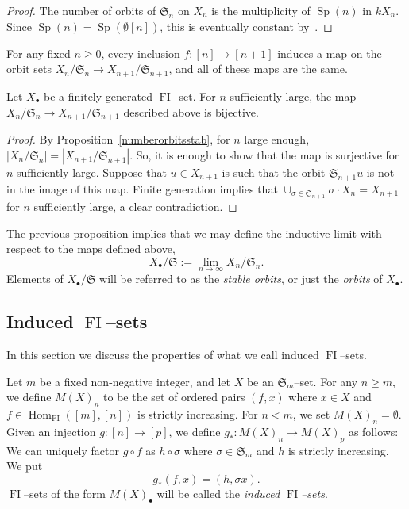 \documentclass[ALCO,ThmDefs,Unicode,epreuves]{cedram}
\DeclareMathOperator{\FI}{FI}
\DeclareMathOperator{\Hom}{Hom}
\DeclareMathOperator{\Sp}{Sp}
\newcommand{\Sn}{\mathfrak{S}}
\newcommand{\dt}{\bullet}
\begin{document}
\begin{proof}
The number of orbits of $\Sn_n$ on $X_n$ is the multiplicity of $\Sp(n)$ in $k X_n$. Since $\Sp(n) = \Sp(\emptyset[n])$, this is eventually constant by~\cite[Theorem~1.13]{CEF}.
\end{proof}

For any fixed $n \geq 0$, every inclusion $f: [n] \to [n+1]$ induces a map on the orbit sets $X_n/\Sn_n \to X_{n+1}/\Sn_{n+1}$, and all of these maps are the same.

\begin{prop} \label{EventuallyBijective}
Let $X_\dt$ be a finitely generated $\FI$--set. For $n$ sufficiently large, the map $X_n/\Sn_n \to X_{n+1}/\Sn_{n+1}$ described above is bijective.
\end{prop}

\begin{proof}
By Proposition~\ref{numberorbitsstab}, for $n$ large enough, $|X_n/\Sn_n| = |X_{n+1}/\Sn_{n+1}|$. So, it is enough to show that the map is surjective for $n$ sufficiently large. Suppose that $u \in X_{n+1}$ is such that the orbit $\Sn_{n+1} u$ is not in the image of this map. Finite generation implies that $\cup_{\sigma \in \Sn_{n+1}} \sigma \cdot X_n=X_{n+1}$ for $n$ sufficiently large, a clear contradiction.
\end{proof}


\begin{definition}
The previous proposition implies that we may define the inductive limit with respect to the maps defined above,
\[
X_{\dt}/\Sn := \lim_{n \to \infty} X_n/\Sn_n.
\]
Elements of $X_{\dt}/\Sn$ will be referred to as the \emph{stable orbits}, or just the \emph{orbits} of $X_\dt$.
\end{definition}

\subsection{Induced \texorpdfstring{$\FI$}{FI}--sets}

In this section we discuss the properties of what we call induced $\FI$--sets.


\begin{definition}\label{inducedset}
Let $m$ be a fixed non-negative integer, and let $X$ be an $\Sn_m$--set. 
For any $n \geq m$, we define $M(X)_n$ to be the set of ordered pairs $(f,x)$
where $x \in X$ and $f \in \Hom_{\FI}([m],[n])$ is strictly increasing. For $n < m$, we set $M(X)_n = \emptyset$.
Given an injection $g:[n] \to [p]$, we define $g_{\ast} : M(X)_n \to M(X)_p$ as follows: 
We can uniquely factor $g \circ f$ as $h \circ \sigma$ where $\sigma \in \Sn_m$ and $h$ is strictly increasing. We put
\[ 
g_{\ast}(f,x) = (h,\sigma x) .
\]
$\FI$--sets of the form $M(X)_\dt$ will be called the \emph{induced $\FI$--sets}.
\end{definition}
\end{document}
